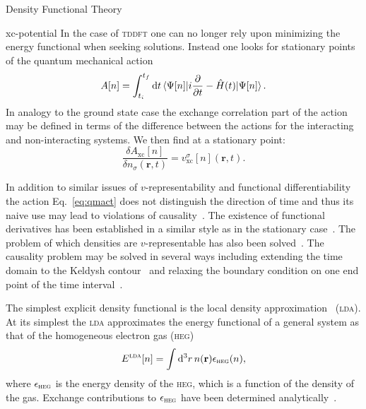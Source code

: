 \documentclass[letterpaper, 11 pt]{report}
\begin{document}
\begin{chapter}{Density Functional Theory \label{chap:dft}}
\begin{section}{xc-potential \label{sec:xcpot}}
      In the case of \textsc{tddft} one can no longer rely upon minimizing the energy functional when
      seeking solutions. Instead one looks for stationary points of the quantum mechanical
      action~\cite{qmaction} 
      \begin{equation} \label{eq:qmact}
         A[n] = \int^{t_f}_{t_i} \mathrm{d}t
            \braket{\Psi[n] |i\frac{\partial}{\partial t} -\hat{H}(t) | \Psi[n]}.
      \end{equation}
      In analogy to the ground state case the exchange correlation part of the action may be defined in
      terms of the difference between the actions for the interacting and non-interacting systems. We
      then find at a stationary point:
      \begin{equation} \label{eq:tdvxc-der}
         \frac{\delta A_\mathrm{xc}[n]}{\delta n_\sigma(\mathbf{r},t)}
            = v^\sigma_\mathrm{xc}[n](\mathbf{r},t).
      \end{equation}

      In addition to similar issues of $v$-representability and functional differentiability the action
      Eq.~\eqref{eq:qmact} does not distinguish the direction of time and thus its naive use may lead
      to violations of causality~\cite{tddft-causality}. The existence of functional derivatives has
      been established in a similar style as in the stationary case~\cite{td-welldef}. The problem of
      which densities are $v$-representable has also been solved~\cite{td-vrep}. The causality problem
      may be solved in several ways including extending the time domain to the Keldysh
      contour~\cite{caus-sol1} and relaxing the boundary condition on one end point of the time
      interval~\cite{caus-sol2}.

      The simplest explicit density functional is the local density approximation~\cite{ks-eq}
      (\textsc{lda}). At its simplest the \textsc{lda} approximates the energy functional of a general
      system as that of the homogeneous electron gas (\textsc{heg})
      \begin{equation} \label{eq:ldaE}
         E^\textsc{lda}[n] = \int \mathrm{d}^3 r \, n(\mathbf{r}) \epsilon_\textsc{heg}(n),
      \end{equation}
      where $\epsilon_\textsc{heg}$ is the energy density of the \textsc{heg}, which is a function of
      the density of the gas. Exchange contributions to $\epsilon_\textsc{heg}$ have been determined
      analytically~\cite{heg}.


\end{section}
\end{chapter}
\end{document}
